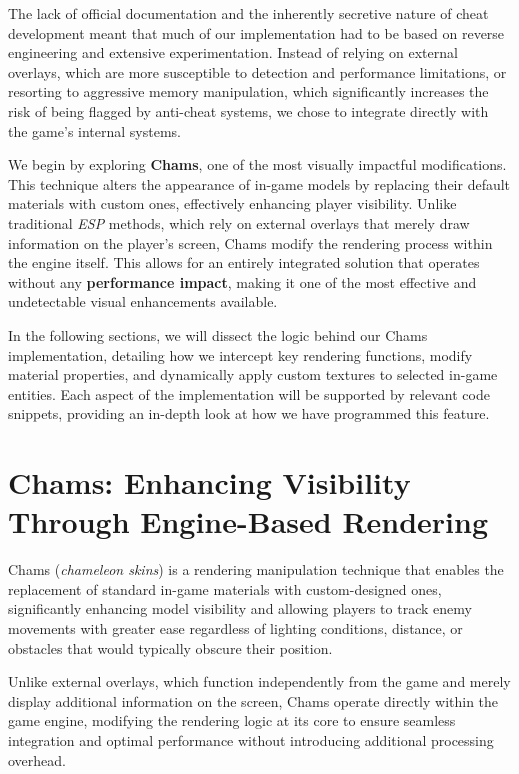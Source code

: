 The lack of official documentation and the inherently secretive nature of cheat development meant that much of our implementation had to be based on reverse engineering and extensive experimentation. Instead of relying on external overlays, which are more susceptible to detection and performance limitations, or resorting to aggressive memory manipulation, which significantly increases the risk of being flagged by anti-cheat systems, we chose to integrate directly with the game’s internal systems. 


We begin by exploring \textbf{Chams}, one of the most visually impactful modifications. This technique alters the appearance of in-game models by replacing their default materials with custom ones, effectively enhancing player visibility. Unlike traditional \textit{ESP} methods, which rely on external overlays that merely draw information on the player’s screen, Chams modify the rendering process within the engine itself. This allows for an entirely integrated solution that operates without any \textbf{performance impact}, making it one of the most effective and undetectable visual enhancements available. 

In the following sections, we will dissect the logic behind our Chams implementation, detailing how we intercept key rendering functions, modify material properties, and dynamically apply custom textures to selected in-game entities. Each aspect of the implementation will be supported by relevant code snippets, providing an in-depth look at how we have programmed this feature.


\section{Chams: Enhancing Visibility Through Engine-Based Rendering}
Chams (\textit{chameleon skins}) is a rendering manipulation technique that enables the replacement of standard in-game materials with custom-designed ones, significantly enhancing model visibility and allowing players to track enemy movements with greater ease regardless of lighting conditions, distance, or obstacles that would typically obscure their position. 

Unlike external overlays, which function independently from the game and merely display additional information on the screen, Chams operate directly within the game engine, modifying the rendering logic at its core to ensure seamless integration and optimal performance without introducing additional processing overhead. 

